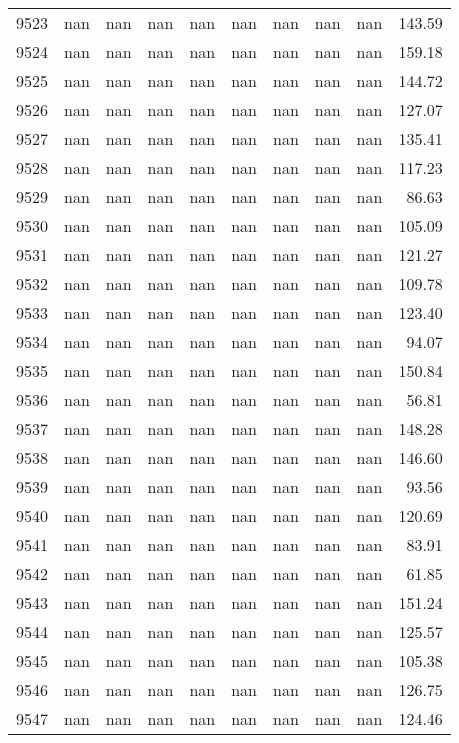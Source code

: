 \begin{tabular}{lrrrrrrrrr}
9523 & nan & nan & nan & nan & nan & nan & nan & nan & 143.59 \\
9524 & nan & nan & nan & nan & nan & nan & nan & nan & 159.18 \\
9525 & nan & nan & nan & nan & nan & nan & nan & nan & 144.72 \\
9526 & nan & nan & nan & nan & nan & nan & nan & nan & 127.07 \\
9527 & nan & nan & nan & nan & nan & nan & nan & nan & 135.41 \\
9528 & nan & nan & nan & nan & nan & nan & nan & nan & 117.23 \\
9529 & nan & nan & nan & nan & nan & nan & nan & nan & 86.63 \\
9530 & nan & nan & nan & nan & nan & nan & nan & nan & 105.09 \\
9531 & nan & nan & nan & nan & nan & nan & nan & nan & 121.27 \\
9532 & nan & nan & nan & nan & nan & nan & nan & nan & 109.78 \\
9533 & nan & nan & nan & nan & nan & nan & nan & nan & 123.40 \\
9534 & nan & nan & nan & nan & nan & nan & nan & nan & 94.07 \\
9535 & nan & nan & nan & nan & nan & nan & nan & nan & 150.84 \\
9536 & nan & nan & nan & nan & nan & nan & nan & nan & 56.81 \\
9537 & nan & nan & nan & nan & nan & nan & nan & nan & 148.28 \\
9538 & nan & nan & nan & nan & nan & nan & nan & nan & 146.60 \\
9539 & nan & nan & nan & nan & nan & nan & nan & nan & 93.56 \\
9540 & nan & nan & nan & nan & nan & nan & nan & nan & 120.69 \\
9541 & nan & nan & nan & nan & nan & nan & nan & nan & 83.91 \\
9542 & nan & nan & nan & nan & nan & nan & nan & nan & 61.85 \\
9543 & nan & nan & nan & nan & nan & nan & nan & nan & 151.24 \\
9544 & nan & nan & nan & nan & nan & nan & nan & nan & 125.57 \\
9545 & nan & nan & nan & nan & nan & nan & nan & nan & 105.38 \\
9546 & nan & nan & nan & nan & nan & nan & nan & nan & 126.75 \\
9547 & nan & nan & nan & nan & nan & nan & nan & nan & 124.46 \\

\end{tabular}

